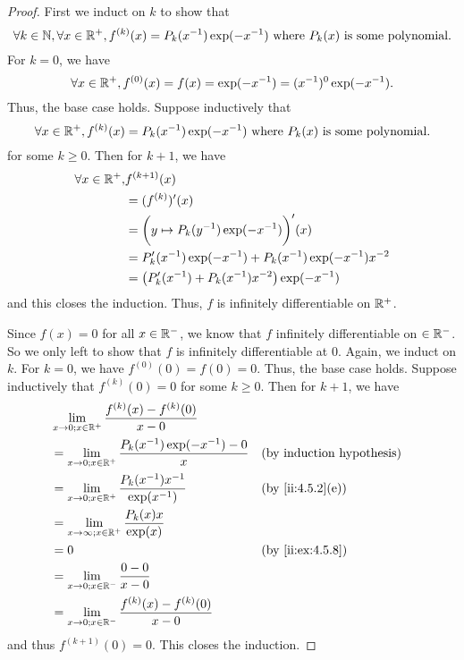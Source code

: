 \begin{proof}
  First we induct on \(k\) to show that
  \[
    \forall k \in \mathbb{N}, \forall x \in \mathbb{R}^+, f^{(k)}(x) = P_k(x^{-1}) \exp(-x^{-1}) \text{ where } P_k(x) \text{ is some polynomial}.
  \]
  For \(k = 0\), we have
  \[
    \forall x \in \mathbb{R}^+, f^{(0)}(x) = f(x) = \exp(-x^{-1}) = (x^{-1})^0 \exp(-x^{-1}).
  \]
  Thus, the base case holds.
  Suppose inductively that
  \[
    \forall x \in \mathbb{R}^+, f^{(k)}(x) = P_k(x^{-1}) \exp(-x^{-1}) \text{ where } P_k(x) \text{ is some polynomial}.
  \]
  for some \(k \geq 0\).
  Then for \(k + 1\), we have
  \begin{align*}
    \forall x \in \mathbb{R}^+, & f^{(k + 1)}(x)                                                  \\
                        & = (f^{(k)})'(x)                                                 \\
                        & = \bigg(y \mapsto P_k(y^{-1}) \exp(-x^{-1})\bigg)'(x)           \\
                        & = P_k'(x^{-1}) \exp(-x^{-1}) + P_k(x^{-1}) \exp(-x^{-1}) x^{-2} \\
                        & = \big(P_k'(x^{-1}) + P_k(x^{-1}) x^{-2}\big) \exp(-x^{-1})
  \end{align*}
  and this closes the induction.
  Thus, \(f\) is infinitely differentiable on \(\mathbb{R}^+\).

  Since \(f(x) = 0\) for all \(x \in \mathbb{R}^-\), we know that \(f\) infinitely differentiable on \(\in \mathbb{R}^-\).
  So we only left to show that \(f\) is infinitely differentiable at \(0\).
  Again, we induct on \(k\).
  For \(k = 0\), we have \(f^{(0)}(0) = f(0) = 0\).
  Thus, the base case holds.
  Suppose inductively that \(f^{(k)}(0) = 0\) for some \(k \geq 0\).
  Then for \(k + 1\), we have
  \begin{align*}
     & \lim_{x \to 0 ; x \in \R^+} \dfrac{f^{(k)}(x) - f^{(k)}(0)}{x - 0}                           \\
     & = \lim_{x \to 0 ; x \in \R^+} \dfrac{P_k(x^{-1}) \exp(-x^{-1}) - 0}{x} &  & \byIH            \\
     & = \lim_{x \to 0 ; x \in \R^+} \dfrac{P_k(x^{-1}) x^{-1}}{\exp(x^{-1})} &  & \by{ii:4.5.2}[e] \\
     & = \lim_{x \to \infty ; x \in \R^+} \dfrac{P_k(x) x}{\exp(x)}                                 \\
     & = 0                                                                    &  & \by{ii:ex:4.5.8} \\
     & = \lim_{x \to 0 ; x \in \R^-} \dfrac{0 - 0}{x - 0}                                           \\
     & = \lim_{x \to 0 ; x \in \R^-} \dfrac{f^{(k)}(x) - f^{(k)}(0)}{x - 0}
  \end{align*}
  and thus \(f^{(k + 1)}(0) = 0\).
  This closes the induction.


\end{proof}

